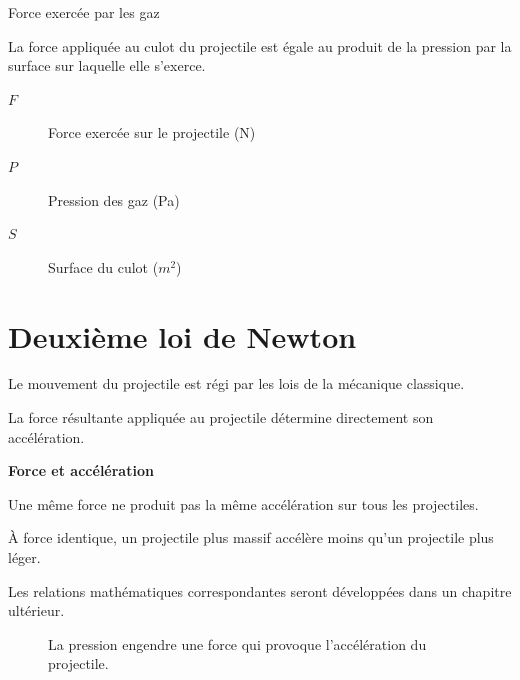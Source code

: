 \begin{formule}{Force exercée par les gaz}

La force appliquée au culot du projectile est égale au produit de la pression
par la surface sur laquelle elle s'exerce.

\begin{description}
\item[$F$] Force exercée sur le projectile (N)
\item[$P$] Pression des gaz (Pa)
\item[$S$] Surface du culot ($m^2$)
\end{description}

\end{formule}

\section{Deuxième loi de Newton}

Le mouvement du projectile est régi par les lois de la mécanique classique.

La force résultante appliquée au projectile détermine directement son
accélération.

\begin{rigueur}{\textbf{Force et accélération}}

Une même force ne produit pas la même accélération sur tous les projectiles.

À force identique, un projectile plus massif accélère moins qu'un projectile
plus léger.

Les relations mathématiques correspondantes seront développées dans un chapitre
ultérieur.

\end{rigueur}

\begin{figure}[htbp]
\centering


\caption{La pression engendre une force qui provoque l'accélération du projectile.}

\end{figure}

